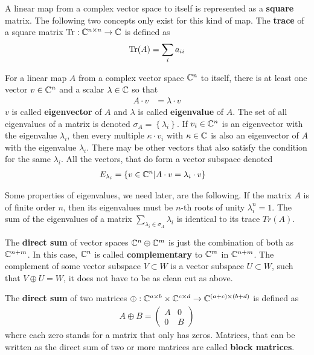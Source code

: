 A linear map from a complex vector space to itself is represented as a \textbf{square} matrix.
The following two concepts only exist for this kind of map.
The \textbf{trace} of a square matrix $\operatorname{Tr}: \mathbb{C}^{n \times n} \to \mathbb{C}$ is defined as
\begin{align}
    \operatorname{Tr}(A) = \sum_i a_{ii}
\end{align}

For a linear map $A$ from a complex vector space $\mathbb{C}^n$ to itself, there is at least one vector $v \in \mathbb{C}^n$ and a scalar $\lambda \in \mathbb{C}$ so that
\begin{align}
    A \cdot v & = \lambda \cdot v
\end{align}
$v$ is called \textbf{eigenvector} of $A$ and $\lambda$ is called \textbf{eigenvalue} of $A$.
The set of all eigenvalues of a matrix is denoted $\sigma_A = \left\{ \lambda_i \right\}$.
If $v_i \in \mathbb{C}^n$ is an eigenvector with the eigenvalue $\lambda_i$, then every multiple $\kappa \cdot v_i$ with $\kappa \in \mathbb{C}$ is also an eigenvector of $A$ with the eigenvalue $\lambda_i$.
There may be other vectors that also satisfy the condition for the same $\lambda_i$.
All the vectors, that do form a vector subspace denoted
\begin{align}
    E_{\lambda_i} & = \left\{ v \in \mathbb{C}^n | A \cdot v = \lambda_i \cdot v \right\}
\end{align}

Some properties of eigenvalues, we need later, are the following.
If the matrix $A$ is of finite order $n$, then its eigenvalues must be $n$-th roots of unity $\lambda_i^n = 1$.
The sum of the eigenvalues of a matrix $\sum_{\lambda_i \in \sigma_A} \lambda_i$ is identical to its trace $Tr(A)$.

The \textbf{direct sum} of vector spaces $\mathbb{C}^n \oplus \mathbb{C}^m$ is just the combination of both as $\mathbb{C}^{n + m}$.
In this case, $\mathbb{C}^n$ is called \textbf{complementary} to $\mathbb{C}^m$ in $\mathbb{C}^{n + m}$.
The complement of some vector subspace $V \subset W$ is a vector subspace $U \subset W$, such that $V \oplus U = W$, it does not have to be as clean cut as above.

The \textbf{direct sum} of two matrices $\oplus: \mathbb{C}^{a \times b} \times \mathbb{C}^{c \times d} \to \mathbb{C}^{(a + c) \times (b + d)}$ is defined as
\begin{align}
    A \oplus B = \begin{pmatrix}
        A & 0 \\
        0 & B
    \end{pmatrix}
\end{align}
where each zero stands for a matrix that only has zeros.
Matrices, that can be written as the direct sum of two or more matrices are called \textbf{block matrices}.

